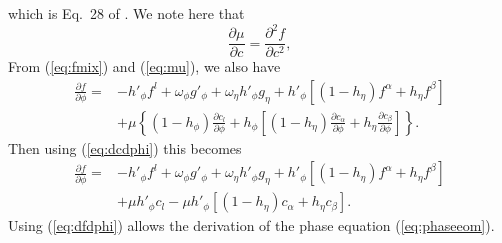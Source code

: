 %
which is Eq.~28 of \cite{PhysRevE.60.7186}.  We note here that 
%
\begin{equation}
  \frac{\partial \mu}{\partial c} = 
  \frac{\partial^2 f}{\partial c^2},
\label{eq:dmudc}
\end{equation}
%
From (\ref{eq:fmix}) and (\ref{eq:mu}), we also have
%
\begin{equation}
\begin{split}
  \frac{\partial f}{\partial\phi} = {}
  & - h'_\phi f^l + \omega_\phi g'_\phi +
    \omega_\eta h'_\phi g_\eta
    + h'_\phi \left[
    ( 1 - h_\eta ) f^\alpha + h_\eta f^\beta \right]
  \\
  & + \mu \left\{ ( 1 - h_\phi )
    \frac{\partial c_l}{\partial \phi}
    + h_\phi \left[
    ( 1 - h_\eta ) \frac{\partial c_\alpha}{\partial \phi}
    + h_\eta \frac{\partial c_\beta}{\partial \phi}
    \right] \right\}.
\end{split}
\end{equation}
%
Then using (\ref{eq:dcdphi}) this becomes
%
\begin{equation}
\begin{split}
  \frac{\partial f}{\partial\phi} = {}
  & - h'_\phi f^l + \omega_\phi g'_\phi +
    \omega_\eta h'_\phi g_\eta
    + h'_\phi \left[
    ( 1 - h_\eta ) f^\alpha + h_\eta f^\beta \right]
  \\
  & + \mu h'_\phi c_l - \mu h'_\phi \left[
    ( 1 - h_\eta ) c_\alpha + h_\eta c_\beta \right].
\label{eq:dfdphi}
\end{split}
\end{equation}
%
Using (\ref{eq:dfdphi}) allows the derivation of the phase equation
(\ref{eq:phaseeom}).

